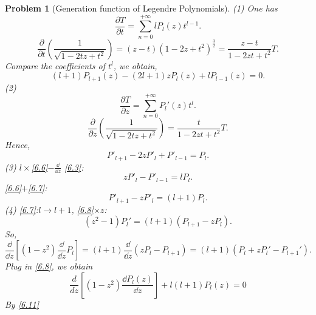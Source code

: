 \documentclass{article}
\theoremstyle{1}
\newtheorem{problem}{Problem}
\newcommand{\pa}{\partial}
\begin{document}
\begin{problem}[Generation function of Legendre Polynomials]
    (1) One has 
    \begin{equation}
        \frac{\pa T}{\pa t}=\sum_{n=0}^{+\infty}lP_l\left(z\right)t^{l-1}.
    \end{equation}
    \begin{equation}
        \frac{\pa}{\pa t}\left(\frac{1}{\sqrt{1-2tz+t^2}}\right)=\left(z-t\right)\left(1-2z+t^2\right)^{\frac{3}{2}}=\frac{z-t}{1-2zt+t^2}T.
    \end{equation}
    Compare the coefficients of $t^l$, we obtain,
    \begin{equation}\label{6.3}
        (l+1)P_{l+1}\left(z\right)-(2l+1)zP_l(z)+lP_{l-1}(z)=0.
    \end{equation}
    (2) \begin{equation}
        \frac{\pa T}{\pa z}=\sum_{n=0}^{+\infty}P_{l}'(z)t^l.
    \end{equation}
    \begin{equation}
        \frac{\pa }{\pa z}\left(\frac{1}{\sqrt{1-2tz+t^2}}\right)=\frac{t}{1-2zt+t^2}T.
    \end{equation}
    Hence,
    \begin{equation}\label{6.6}
        P'_{l+1}-2zP'_l+P'_{l-1}=P_l.
    \end{equation}
    (3) $l\times$\eqref{6.6}$-\frac{\dd}{\dd{z}}$ \eqref{6.3}:
    \begin{equation}\label{6.7}
        zP'_l-P'_{l-1}=lP_l.
    \end{equation}
    \eqref{6.6}$+$\eqref{6.7}:
    \begin{equation}\label{6.8}
        P'_{l+1}-zP'_l=(l+1)P_l.
    \end{equation}
    (4) \eqref{6.7}:$l\rightarrow l+1$, \eqref{6.8}$\times z$:
    \begin{equation}
        (z^2-1)P_l'=(l+1)(P_{l+1}-zP_l).
    \end{equation}
    So, 
    \begin{equation}
        \frac{\dd}{\dd{z}}\left[(1-z^2)\frac{\dd}{\dd{z}}P_l\right]=(l+1)\frac{\dd}{\dd{z}}\left(zP_l-P_{l+1}\right)=(l+1)(P_l+zP_l'-P_{l+1}').
    \end{equation}
    Plug in \eqref{6.8}, we obtain
    \begin{equation}\label{6.11}
        \frac{d}{dz} \left[ (1 - z^2) \frac{\dd P_l(z)}{\dd z} \right] + l(l + 1)P_l(z) = 0
    \end{equation}
    By \eqref{6.11}
    \begin{equation}\label{6.12}

\end{equation}
\end{problem}
\end{document}
